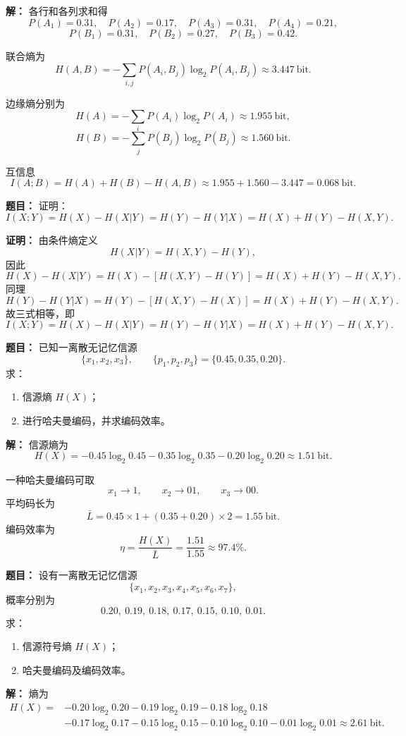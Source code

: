 \par\textbf{解：}
各行和各列求和得
\[
P(A_1)=0.31,\quad P(A_2)=0.17,\quad P(A_3)=0.31,\quad P(A_4)=0.21,
\]
\[
P(B_1)=0.31,\quad P(B_2)=0.27,\quad P(B_3)=0.42.
\]

联合熵为
\[
H(A,B)=-\sum_{i,j}P(A_i,B_j)\log_2 P(A_i,B_j)\approx 3.447\ \text{bit}.
\]

边缘熵分别为
\[
H(A)=-\sum_i P(A_i)\log_2 P(A_i)\approx 1.955\ \text{bit},
\]
\[
H(B)=-\sum_j P(B_j)\log_2 P(B_j)\approx 1.560\ \text{bit}.
\]

互信息
\[
I(A;B)=H(A)+H(B)-H(A,B)\approx 1.955+1.560-3.447=0.068\ \text{bit}.
\]

\medskip
{}
\textbf{题目：}
证明：
\[
I(X;Y)=H(X)-H(X|Y)=H(Y)-H(Y|X)=H(X)+H(Y)-H(X,Y).
\]

\par\textbf{证明：}
由条件熵定义
\[
H(X|Y)=H(X,Y)-H(Y),
\]
因此
\[
H(X)-H(X|Y)=H(X)-[H(X,Y)-H(Y)]=H(X)+H(Y)-H(X,Y).
\]
同理
\[
H(Y)-H(Y|X)=H(Y)-[H(X,Y)-H(X)]=H(X)+H(Y)-H(X,Y).
\]
故三式相等，即
\[
I(X;Y)=H(X)-H(X|Y)=H(Y)-H(Y|X)=H(X)+H(Y)-H(X,Y).
\]

\medskip
{}
\textbf{题目：}
已知一离散无记忆信源
\[
\{x_1,x_2,x_3\},
\qquad
\{p_1,p_2,p_3\}=\{0.45,0.35,0.20\}.
\]
求：
\begin{enumerate}
\item 信源熵 $H(X)$；
\item 进行哈夫曼编码，并求编码效率。
\end{enumerate}

\par\textbf{解：}
信源熵为
\[
H(X)=-0.45\log_2 0.45-0.35\log_2 0.35-0.20\log_2 0.20\approx 1.51\ \text{bit}.
\]

一种哈夫曼编码可取
\[
x_1\to 1,\qquad x_2\to 01,\qquad x_3\to 00.
\]
平均码长为
\[
\bar L=0.45\times 1+(0.35+0.20)\times 2=1.55\ \text{bit}.
\]
编码效率为
\[
\eta=\frac{H(X)}{\bar L}=\frac{1.51}{1.55}\approx 97.4\%.
\]

\medskip
{}
\textbf{题目：}
设有一离散无记忆信源
\[
\{x_1,x_2,x_3,x_4,x_5,x_6,x_7\},
\]
概率分别为
\[
0.20,\ 0.19,\ 0.18,\ 0.17,\ 0.15,\ 0.10,\ 0.01.
\]
求：
\begin{enumerate}
\item 信源符号熵 $H(X)$；
\item 哈夫曼编码及编码效率。
\end{enumerate}

\par\textbf{解：}
熵为
\[
\begin{aligned}
H(X)=&-0.20\log_2 0.20-0.19\log_2 0.19-0.18\log_2 0.18 \\
&-0.17\log_2 0.17-0.15\log_2 0.15-0.10\log_2 0.10-0.01\log_2 0.01
\approx 2.61\ \text{bit}.
\end{aligned}
\]

